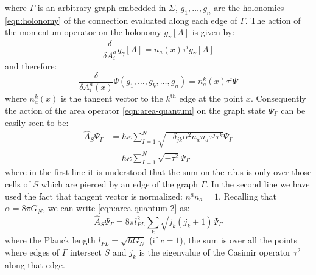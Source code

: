 \documentclass[submission, Phys]{SciPost}
\begin{document}
where $ \Gamma $ is an arbitrary graph embedded in $ \Sigma $, $ g_1,\ldots,g_n $ are the holonomies \eqref{eqn:holonomy} of the connection evaluated along each edge of $ \Gamma $. The action of the momentum operator on the holonomy $ g_\gamma[A] $ is given by:
\begin{equation}\label{eqn:edge-momentum}
	\frac{\delta}{\delta A^a_i} g_\gamma[A] = n_a (x) \tau^i g_\gamma[A]
\end{equation}
and therefore:
\begin{equation}\label{eqn:graph-momentum}
	\frac{\delta}{\delta A^a_i(x)} \Psi(g_1,\ldots,g_k,\ldots,g_n) = n_a^k(x) \tau^i \Psi
\end{equation}
where $ n_a^k(x) $ is the tangent vector to the $ k^\text{th} $ edge at the point $ x $. Consequently the action of the area operator \eqref{eqn:area-quantum} on the graph state $ \Psi_\Gamma $ can be easily seen to be:
\begin{align}\label{eqn:area-quantum-2}
	\hat A_S \Psi_\Gamma & = \hbar \kappa \sum_{I=1}^N \sqrt{-\delta_{jk} \alpha^2 n_a n_a \tau^j \tau^k } \Psi_\Gamma \nonumber \\
	& = \hbar \kappa \sum_{I=1}^N \sqrt{- \tau^2} \Psi_\Gamma
\end{align}
where in the first line it is understood that the sum on the r.h.s is only over those cells of $ S $ which are pierced by an edge of the graph $ \Gamma $. In the second line we have used the fact that tangent vector is normalized: $ n^a n_a = 1 $. Recalling that $ \alpha = 8 \pi G_N $, we can write \eqref{eqn:area-quantum-2} as:
\begin{equation}\label{eqn:area-quantum-3}
	\hat A_S \Psi_\Gamma = 8 \pi l_{PL}^2 \sum_k \sqrt{ j_k (j_k + 1)} \Psi_\Gamma
\end{equation}
where the Planck length $ l_{PL} = \sqrt{\hbar G_N} $ (if $ c = 1 $), the sum is over all the points where edges of $ \Gamma $ intersect $ S $ and $ j_k $ is the eigenvalue of the Casimir operator $ \tau^2 $ along that edge.
\end{document}
